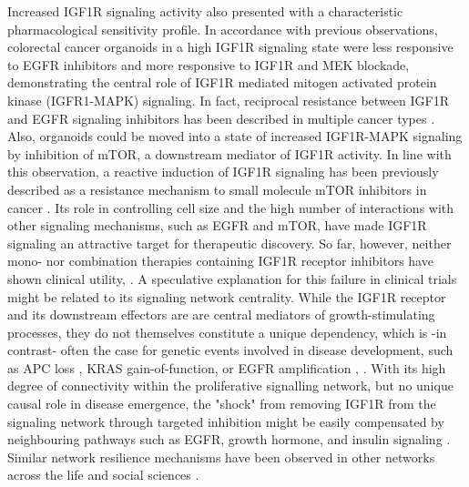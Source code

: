 \begin{flushleft}
Increased IGF1R signaling activity also presented with a characteristic pharmacological sensitivity profile. In accordance with previous observations\citep{yaoCombinedIGF1RMEK2016}, colorectal cancer organoids in a high IGF1R signaling state were less responsive to EGFR inhibitors and more responsive to IGF1R and MEK blockade, demonstrating the central role of IGF1R mediated mitogen activated protein kinase (IGFR1-MAPK) signaling. In fact, reciprocal resistance between IGF1R and EGFR signaling inhibitors has been described in multiple cancer types \citep{huaInsulinlikeGrowthFactor2020a}. Also, organoids could be moved into a state of increased IGF1R-MAPK signaling by inhibition of mTOR, a downstream mediator of IGF1R activity. In line with this observation, a reactive induction of IGF1R signaling has been previously described as a resistance mechanism to small molecule mTOR inhibitors in cancer \citep{sharma_chromatin-mediated_2010, yoonFocalAdhesionIGF1RDependent2017a}. Its role in controlling cell size and the high number of interactions with other signaling mechanisms, such as EGFR and mTOR, have made IGF1R signaling an attractive target for therapeutic discovery. So far, however, neither mono- nor combination therapies containing IGF1R receptor inhibitors have shown clinical utility\citep{beckwithMinireviewWereIGF2015}, \citep{CostsCausesOncologya}. A speculative explanation for this failure in clinical trials might be related to its signaling network centrality. While the IGF1R receptor and its downstream effectors are are central mediators of growth-stimulating processes, they do not themselves constitute a unique dependency, which is -in contrast- often the case for genetic events involved in disease development, such as APC loss \citep{Dow2015-pc}, KRAS gain-of-function, or EGFR amplification \citep{katoRevisitingEpidermalGrowth2019}, \citep{randonEGFRAmplificationMetastatic2021}. With its high degree of connectivity within the proliferative signalling network, but no unique causal role in disease emergence, the "shock" from removing IGF1R from the signaling network through targeted inhibition might be easily compensated by neighbouring pathways such as EGFR, growth hormone, and insulin signaling \citep{beckwithMinireviewWereIGF2015}. Similar network resilience mechanisms have been observed in other networks across the life and social sciences \citep{liuNetworkResilience2022a}.
\smallbreak


\end{flushleft}
